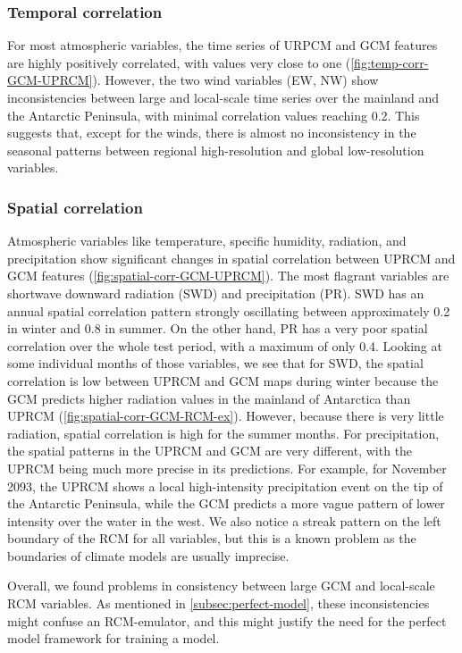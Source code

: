 \documentclass[a4paper,11pt,oneside]{report}
\begin{document}
\subsubsection{Temporal correlation}
For most atmospheric variables, the time series of URPCM and GCM features are highly positively correlated, with values very close to one (\autoref{fig:temp-corr-GCM-UPRCM}). However, the two wind variables (EW, NW) show inconsistencies between large and local-scale time series over the mainland and the Antarctic Peninsula, with minimal correlation values reaching 0.2. This suggests that, except for the winds, there is almost no inconsistency in the seasonal patterns between regional high-resolution and global low-resolution variables.

\subsubsection{Spatial correlation}
 Atmospheric variables like temperature, specific humidity, radiation, and precipitation show significant changes in spatial correlation between UPRCM and GCM features (\autoref{fig:spatial-corr-GCM-UPRCM}). The most flagrant variables are shortwave downward radiation (SWD) and precipitation (PR). SWD has an annual spatial correlation pattern strongly oscillating between approximately 0.2 in winter and 0.8 in summer. On the other hand, PR has a very poor spatial correlation over the whole test period, with a maximum of only 0.4. Looking at some individual months of those variables, we see that for SWD, the spatial correlation is low between UPRCM and GCM maps during winter because the GCM predicts higher radiation values in the mainland of Antarctica than UPRCM (\autoref{fig:spatial-corr-GCM-RCM-ex}). However, because there is very little radiation, spatial correlation is high for the summer months. For precipitation, the spatial patterns in the UPRCM and GCM are very different, with the UPRCM being much more precise in its predictions. For example, for November 2093, the UPRCM shows a local high-intensity precipitation event on the tip of the Antarctic Peninsula, while the GCM predicts a more vague pattern of lower intensity over the water in the west. We also notice a streak pattern on the left boundary of the RCM for all variables, but this is a known problem as the boundaries of climate models are usually imprecise. 

Overall, we found problems in consistency between large GCM and local-scale RCM variables. As mentioned in \autoref{subsec:perfect-model}, these inconsistencies might confuse an RCM-emulator, and this might justify the need for the perfect model framework for training a model. 
\end{document}
